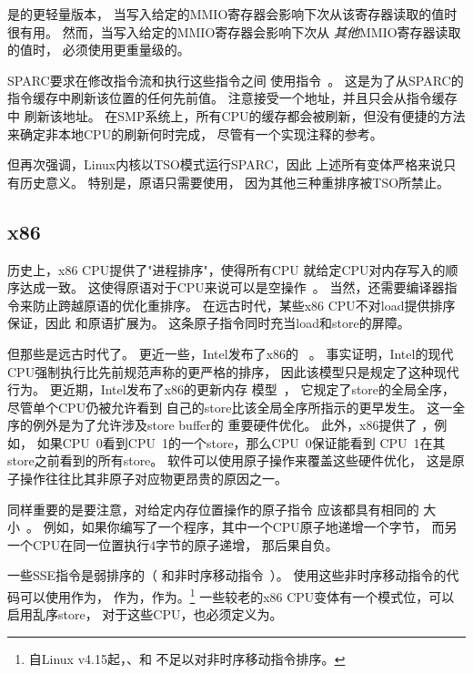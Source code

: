 是的更轻量版本，
当写入给定的MMIO寄存器会影响下次从该寄存器读取的值时很有用。
然而，当写入给定的MMIO寄存器会影响下次从
{\em 其他}MMIO寄存器读取的值时，
必须使用更重量级的。

SPARC要求在修改指令流和执行这些指令之间
使用指令~\cite{SPARC94}。
这是为了从SPARC的指令缓存中刷新该位置的任何先前值。
注意接受一个地址，并且只会从指令缓存中
刷新该地址。
在SMP系统上，所有CPU的缓存都会被刷新，但没有便捷的方法
来确定非本地CPU的刷新何时完成，
尽管有一个实现注释的参考。

但再次强调，Linux内核以TSO模式运行SPARC，因此
上述所有变体严格来说只有历史意义。
特别是，原语只需要使用，
因为其他三种重排序被TSO所禁止\@。

\subsection{x86}

历史上，x86 CPU提供了"进程排序"，使得所有CPU
就给定CPU对内存写入的顺序达成一致。
这使得原语对于CPU来说可以是空操作~\cite{IntelXeonV3-96a}。
当然，还需要编译器指令来防止跨越原语的优化重排序。
在远古时代，某些x86 CPU不对load提供排序保证，因此
和原语扩展为。
这条原子指令同时充当load和store的屏障。

但那些是远古时代了。
更近一些，Intel发布了x86的
~\cite{Intelx86MemoryOrdering2007}。
事实证明，Intel的现代CPU强制执行比先前规范声称的更严格的排序，
因此该模型只是规定了这种现代行为。
更近期，Intel发布了x86的更新内存
模型~\cite[Section 8.2]{Intel64IA32v3A2011}，
它规定了store的全局全序，尽管单个CPU仍被允许看到
自己的store比该全局全序所指示的更早发生。
这一全序的例外是为了允许涉及store buffer的
重要硬件优化。
此外，x86提供了
，例如，
如果CPU~0看到CPU~1的一个store，那么CPU~0保证能看到
CPU~1在其store之前看到的所有store。
软件可以使用原子操作来覆盖这些硬件优化，
这是原子操作往往比其非原子对应物更昂贵的原因之一。

同样重要的是要注意，对给定内存位置操作的原子指令
应该都具有相同的
大小~\cite[Section 8.1.2.2]{Intel64IA32v3A2016}。
例如，如果你编写了一个程序，其中一个CPU原子地递增一个字节，
而另一个CPU在同一位置执行4字节的原子递增，
那后果自负。

一些SSE指令是弱排序的（
和非时序移动指令~\cite{IntelXeonV2b-96a}）。
使用这些非时序移动指令的代码可以使用作为，
作为，作为。\footnote{
	自Linux v4.15起，、和
	不足以对非时序移动指令排序。}
一些较老的x86 CPU变体有一个模式位，可以启用乱序store，
对于这些CPU，也必须定义为。

